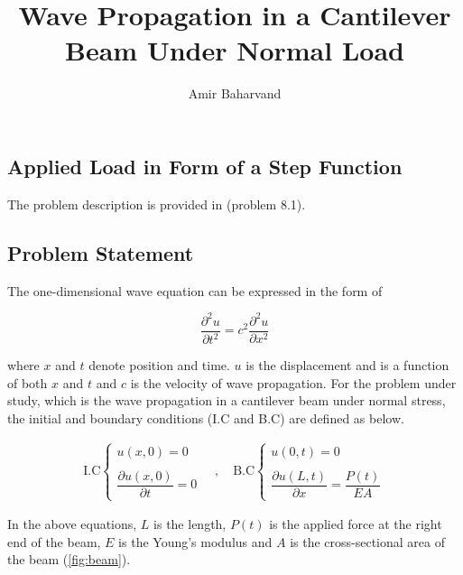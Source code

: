 \documentclass{article}
\title{Wave Propagation in a Cantilever Beam Under Normal Load}
\author{Amir Baharvand }
\date{}
\begin{document}
\maketitle

\subsection{Applied Load in Form of a Step Function}

The problem description is provided in \cite{ACHENBACH:1975} (problem 8.1).

\subsection{Problem Statement}
The one-dimensional wave equation can be expressed in the form of

\begin{equation}
    \dfrac{\partial^2 u}{\partial t^2} = c^2 \dfrac{\partial^2 u}{\partial x^2}
    \label{eq:wave_eqn}
\end{equation}

where $x$ and $t$ denote position and time. $u$ is the displacement and is a function of both $x$ and $t$ and $c$ is the velocity of wave propagation. For the problem under study, which is the wave propagation in a cantilever beam under normal stress, the initial and boundary conditions (I.C and B.C) are defined as below.

\begin{equation*}
\begin{matrix}
    \text{I.C}\begin{cases}
        u(x, 0) = 0 \\ 
        \\
        \dfrac{\partial u(x, 0)}{\partial t} = 0 
    \end{cases} \quad , \quad
    \text{B.C}\begin{cases}
        u(0, t) = 0 \\
        \\
        \dfrac{\partial u(L, t)}{\partial x} = \dfrac{P(t)}{EA}
    \end{cases}
\end{matrix}
\end{equation*}

In the above equations, $L$ is the length, $P(t)$ is the applied force at the right end of the beam, $E$ is the Young's modulus and $A$ is the cross-sectional area of the beam (\cref{fig:beam}).
\end{document}
